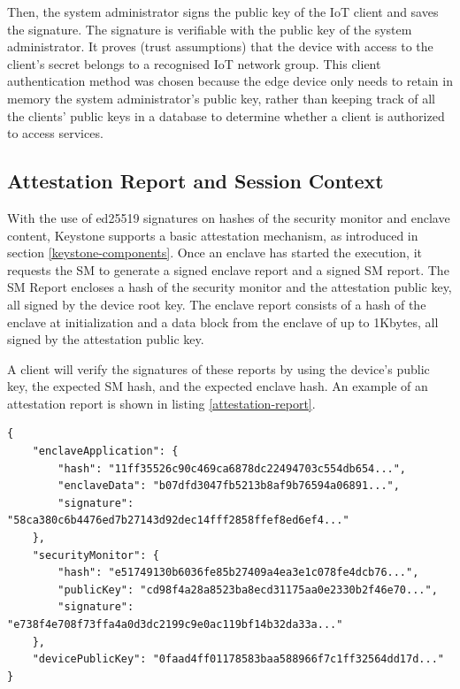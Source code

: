 Then, the system administrator signs the public key of the IoT client and saves the signature. The signature is verifiable with the public key of the system administrator. It proves (trust assumptions) that the device with access to the client's secret belongs to a recognised IoT network group. This client authentication method was chosen because the edge device only needs to retain in memory the system administrator's public key, rather than keeping track of all the clients' public keys in a database to determine whether a client is authorized to access services.

\subsection{Attestation Report and Session Context}
With the use of ed25519 signatures on hashes of the security monitor and enclave content, Keystone supports a basic attestation mechanism, as introduced in section \ref{keystone-components}. Once an enclave has started the execution, it requests the SM to generate a signed enclave report and a signed SM report. The SM Report encloses a hash of the security monitor and the attestation public key, all signed by the device root key. The enclave report consists of a hash of the enclave at initialization and a data block from the enclave of up to 1Kbytes, all signed by the attestation public key. 

A client will verify the signatures of these reports by using the device's public key, the expected SM hash, and the expected enclave hash. An example of an attestation report is shown in listing \ref{attestation-report}. \\

\begin{lstlisting}[caption={Example of a attestation report  generated by the enclave},captionpos=b,style=json, label={attestation-report},frame=single]
{
    "enclaveApplication": {
        "hash": "11ff35526c90c469ca6878dc22494703c554db654...",
        "enclaveData": "b07dfd3047fb5213b8af9b76594a06891...",
        "signature": "58ca380c6b4476ed7b27143d92dec14fff2858ffef8ed6ef4..."
    },
    "securityMonitor": {
        "hash": "e51749130b6036fe85b27409a4ea3e1c078fe4dcb76...",
        "publicKey": "cd98f4a28a8523ba8ecd31175aa0e2330b2f46e70...",
        "signature": "e738f4e708f73ffa4a0d3dc2199c9e0ac119bf14b32da33a..."
    },
    "devicePublicKey": "0faad4ff01178583baa588966f7c1ff32564dd17d..."
}
\end{lstlisting}

